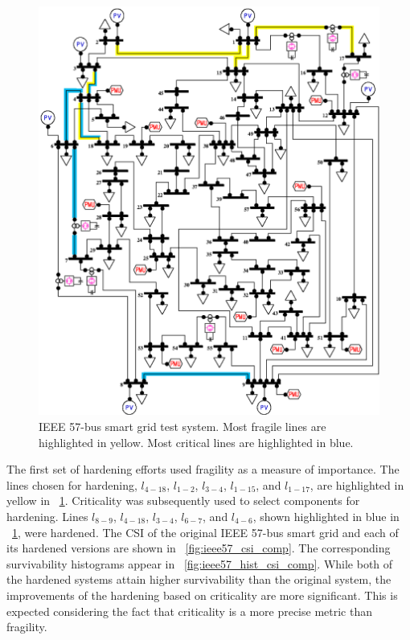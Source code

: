 \documentclass[review]{elsarticle}
\begin{document}
\begin{figure}[!ht]
\centering
\includegraphics[width=0.95\columnwidth]{ieee57_highlighted}
\caption{IEEE 57-bus smart grid test system. Most fragile lines are highlighted in yellow. Most critical lines are highlighted in blue.}
\label{fig:ieee57_highlighted}
\end{figure}

The first set of hardening efforts used fragility as a measure of importance. The lines chosen for hardening, $l_{4-18}$, $l_{1-2}$, $l_{3-4}$, $l_{1-15}$, and $l_{1-17}$, are highlighted in yellow in \figurename~\ref{fig:ieee57_highlighted}. Criticality was subsequently used to select components for hardening. Lines $l_{8-9}$, $l_{4-18}$, $l_{3-4}$, $l_{6-7}$, and $l_{4-6}$, shown highlighted in blue in \figurename~\ref{fig:ieee57_highlighted}, were hardened. The CSI of the original IEEE 57-bus smart grid and each of its hardened versions are shown in \figurename~\ref{fig:ieee57_csi_comp}. The corresponding survivability histograms appear in \figurename~\ref{fig:ieee57_hist_csi_comp}. While both of the hardened systems attain higher survivability than the original system, the improvements of the hardening based on criticality are more significant. This is expected considering the fact that criticality is a more precise metric than fragility.
\end{document}
